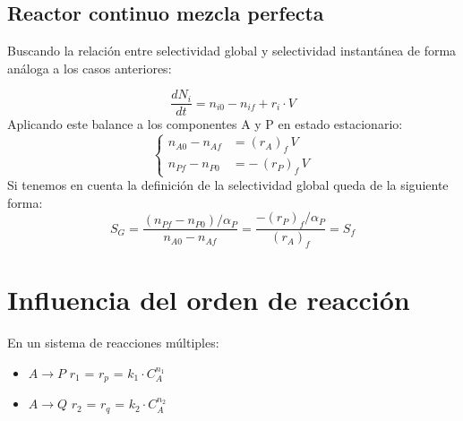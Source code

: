 \subsection{Reactor continuo mezcla perfecta}
\noindent Buscando la relación entre selectividad global y selectividad instantánea de forma análoga a los casos anteriores:

\begin{equation}
  \frac{dN_i}{dt} = n_{i0} - n_{if} + r_i\cdot V
\end{equation}
\noindent Aplicando este balance a los componentes A y P en estado estacionario:
\begin{equation}
  \left\{
  \begin{aligned}
    n_{A0} - n_{Af} & = (r_{A})_f \, V     \\[6pt]
    n_{Pf} - n_{P0} & = -\, (r_{P})_f \, V
  \end{aligned}
  \right.
  \label{eq:Sg_rcmp}
\end{equation}
\noindent Si tenemos en cuenta la definición de la selectividad global queda de la siguiente forma:
\begin{equation}
  S_G = \frac{(n_{Pf}-n_{P0})/\alpha_P}{n_{A0}-n_{Af}} = \frac{-(r_P)_f/\alpha_P}{(r_A)_f} = S_f
\end{equation}

\section{Influencia del orden de reacción}

En un sistema de reacciones múltiples:

\begin{itemize}
  \item $ A \rightarrow P$  \hspace{2mm} $r_1$ = $r_p$ = $k_1 \cdot C_A^{n_1}$
  \item $A \rightarrow Q$ \hspace{2mm} $r_2$ = $r_q$ = $k_2 \cdot C_A^{n_2}$
\end{itemize}

